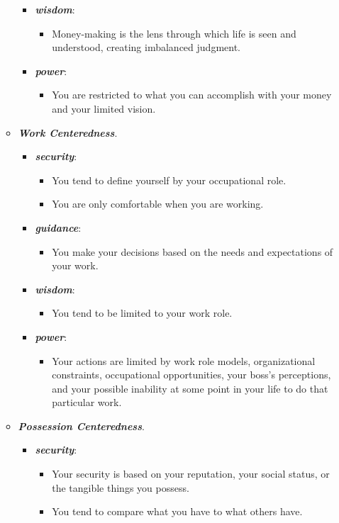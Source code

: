 \documentclass[11pt]{article}
\begin{document}
\begin{itemize}
\begin{itemize}
\begin{itemize}
\item \emph{\textbf{wisdom}}:
\begin{itemize}
\item Money-making is the lens through which life is seen and understood, creating imbalanced judgment.
\end{itemize}

\item \emph{\textbf{power}}:
\begin{itemize}
\item You are restricted to what you can accomplish with your money and your limited vision.
\end{itemize}
\end{itemize}

\item \emph{\textbf{Work Centeredness}}.
\begin{itemize}
\item \emph{\textbf{security}}: 
\begin{itemize}
\item You tend to define yourself by your occupational role.
\item You are only comfortable when you are working.
\end{itemize}
  
\item \emph{\textbf{guidance}}:
\begin{itemize}
\item You make your decisions based on the needs and expectations of your work.
\end{itemize}
  
\item \emph{\textbf{wisdom}}:
\begin{itemize}
\item You tend to be limited to your work role.
\end{itemize}

\item \emph{\textbf{power}}:
\begin{itemize}
\item Your actions are limited by work role models, organizational constraints, occupational opportunities, your boss's perceptions, and your possible inability at some point in your life to do that particular work.
\end{itemize}
\end{itemize}

\item \emph{\textbf{Possession Centeredness}}.
\begin{itemize}
\item \emph{\textbf{security}}: 
\begin{itemize}
\item Your security is based on your reputation, your social status, or the tangible things you possess.
\item You tend to compare what you have to what others have.
\end{itemize}
  

\end{itemize}
\end{itemize}
\end{itemize}
\end{document}
